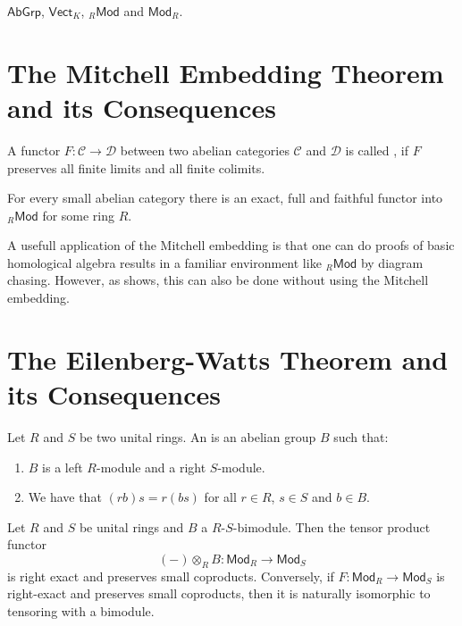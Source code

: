 \begin{examples}
	$\mathsf{AbGrp}$, $\mathsf{Vect}_K$, $_{R}\mathsf{Mod}$ and $\mathsf{Mod}_R$.	
\end{examples}

\section{The Mitchell Embedding Theorem and its Consequences}

\begin{definition}
	A functor $F : \mathcal{C} \to \mathcal{D}$ between two abelian categories $\mathcal{C}$ and $\mathcal{D}$ is called , if $F$ preserves all finite limits and all finite colimits.
\end{definition}

\begin{theorem}
	For every small abelian category there is an exact, full and faithful functor into $_{R}\mathsf{Mod}$ for some ring $R$.
	\label{thm:mitchell_embedding}
\end{theorem}

A usefull application of the Mitchell embedding is that one can do proofs of basic homological algebra results in a familiar environment like $_{R}\mathsf{Mod}$ by diagram chasing. However, as \cite[202--208]{maclane:categories:1978} shows, this can also be done without using the Mitchell embedding.

\section{The Eilenberg-Watts Theorem and its Consequences}

\begin{definition}[Bimodule]
	Let $R$ and $S$ be two unital rings. An  is an abelian group $B$ such that:
	\begin{enumerate}[label = \textup{(}\alph*\textup{)},wide = 0pt]
		\item $B$ is a left $R$-module and a right $S$-module.
		\item We have that $(rb)s = r(bs)$ for all $r \in R$, $s \in S$ and $b \in B$.
	\end{enumerate}
\end{definition}

\begin{theorem}
	Let $R$ and $S$ be unital rings and $B$ a $R$-$S$-bimodule. Then the tensor product functor
	\begin{equation*}
		(-)\otimes_R B : \mathsf{Mod}_R \to \mathsf{Mod}_S
	\end{equation*}
	\noindent is right exact and preserves small coproducts. Conversely, if $F : \mathsf{Mod}_R \to \mathsf{Mod}_S$ is right-exact and preserves small coproducts, then it is naturally isomorphic to tensoring with a bimodule.
\end{theorem}

\printbibliography

